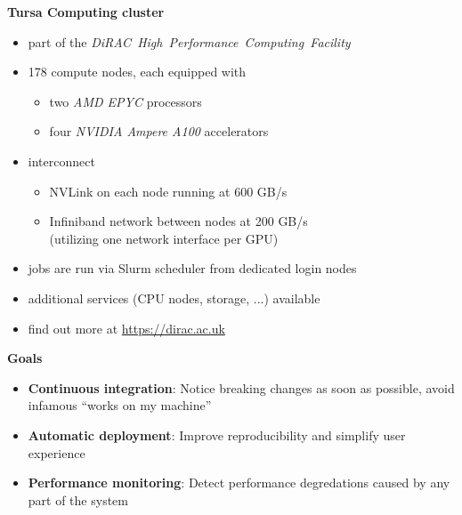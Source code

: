 \documentclass[english,xcolor=pst,11pt]{beamer}
\begin{document}
\begin{frame}
 \textbf{Tursa Computing cluster}
 \begin{itemize}
  \item part of the \emph{DiRAC~High~Performance~Computing~Facility}
  \item 178 compute nodes, each equipped with
  \begin{itemize}
    \item two \emph{AMD EPYC} processors
    \item four \emph{NVIDIA Ampere A100} accelerators
  \end{itemize}
  \item interconnect
  \begin{itemize}
   \item NVLink on each node running at 600 GB/s
   \item Infiniband network between nodes at 200 GB/s \\ (utilizing one network interface per GPU)
  \end{itemize}

  \item jobs are run via Slurm scheduler from dedicated login nodes
  \item additional services (CPU nodes, storage, ...) available
  \item find out more at \url{https://dirac.ac.uk}

 \end{itemize}
\end{frame}

\begin{frame}

\textbf{Goals}
\begin{itemize}
 \item \textbf{Continuous integration}: Notice breaking changes as soon as possible, avoid infamous ``works on my machine''
 \item \textbf{Automatic deployment}: Improve reproducibility and simplify user experience
 \item \textbf{Performance monitoring}: Detect performance degredations caused by any part of the system
\end{itemize}

\end{frame}
\end{document}
